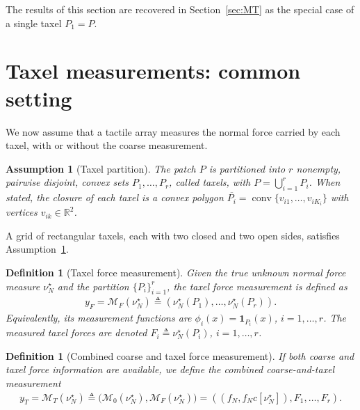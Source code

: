 \documentclass[11pt,a4paper]{article}
\theoremstyle{plain}
\newtheorem{definition}[theorem]{Definition}
\newtheorem{assumption}[theorem]{Assumption}
\newcommand{\R}{\mathbb{R}}
\begin{document}
The results of this section are recovered in Section~\ref{sec:MT} as the special case of a single taxel $P_1=P$.

\section{Taxel measurements: common setting}
\label{sec:taxels}

We now assume that a tactile array measures the normal force carried by each taxel, with or without the coarse measurement.

\begin{assumption}[Taxel partition]
\label{ass:taxels}
    The patch $P$ is partitioned into $r$ nonempty, pairwise disjoint, convex sets $P_1,\ldots,P_r$, called \textit{taxels},
    with $P=\bigcup_{i=1}^rP_i$. When stated, the closure of each taxel is a convex polygon
    $\overline{P_i}=\operatorname{conv}\{v_{i1},\ldots,v_{iK_i}\}$ with vertices $v_{ik}\in\R^2$.
\end{assumption}
A grid of rectangular taxels, each with two closed and two open sides, satisfies Assumption~\ref{ass:taxels}.

\begin{definition}[Taxel force measurement]\label{def:MF}
    Given the true unknown normal force measure $\nu_N^\star$ and the partition $\{P_i\}_{i=1}^r$, the \textit{taxel force measurement} is defined as
    \begin{align}
    y_F = \mathcal M_F(\nu_N^\star) \triangleq
    \left(
    \nu_N^\star(P_1),\ldots,\nu_N^\star(P_r)
    \right).
    \end{align}
    Equivalently, its measurement functions are
    $\phi_i(x)=\mathbf 1_{P_i}(x)$, $i=1,\ldots,r$.
    The measured taxel forces are denoted  $F_i\triangleq\nu_N^\star(P_i)$, $i=1,\ldots,r$.
\end{definition}

\begin{definition}[Combined coarse and taxel force measurement]
\label{def:MT}
If both coarse and taxel force information are available, we define the \textit{combined coarse-and-taxel measurement}
\begin{align}
    y_T=\mathcal M_T(\nu_N^\star)
    \triangleq
    \bigl(
    \mathcal M_0(\nu_N^\star),
    \mathcal M_F(\nu_N^\star)
    \bigr)
    = \left(
    (f_N,f_Nc[\nu_N^\star]), F_1,\ldots,F_r\right).
\end{align}
\end{definition}
\end{document}
